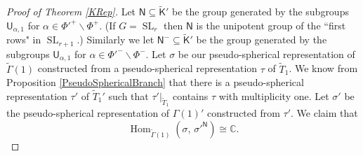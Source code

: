 \documentclass[10pt, letterpaper]{amsart}
\theoremstyle{plain}
\theoremstyle{definition}
\numberwithin{equation}{section}
\newcommand{\SL}{\operatorname{SL}}
\newcommand{\Tt}{\widetilde{T}}
\newcommand{\Gammaft}{\widetilde{\mathsf{\Gamma}}}
\newcommand{\Hom}{\operatorname{Hom}}
\newcommand{\Nf}{\mathsf{N}}
\newcommand{\Uf}{\mathsf{U}}
\newcommand{\Gammaf}{\mathsf{\Gamma}}
\newcommand{\Kft}{\widetilde{\mathsf{K}}}
\begin{document}
\begin{proof}[Proof of Theorem \ref{KRep}]
    Let $\Nf\subseteq\Kft'$ be the group generated by the subgroups $\Uf_{\alpha, 1}$ for $\alpha\in{\Phi'}^+\smallsetminus\Phi^+$. (If $G=\SL_r$ then $\Nf$ is the unipotent group of the ``first rows" in $\SL_{r+1}$.)  Similarly we let $\Nf^-\subseteq\Kft'$ be the group generated by the subgroups $\Uf_{\alpha, 1}$ for $\alpha\in{\Phi'}^-\smallsetminus\Phi^-$. Let $\sigma$ be our pseudo-spherical representation of $\Gammaft(1)$ constructed from a pseudo-spherical representation $\tau$ of $\Tt_1$. We know from Proposition \ref{PseudoSphericalBranch} that there is a pseudo-spherical representation $\tau'$ of $\Tt_1'$ such that $\tau'|_{\Tt_1}$ contains $\tau$ with multiplicity one. Let $\sigma'$ be the pseudo-spherical representation of $\Gammaf(1)'$ constructed from $\tau'$. We claim that
    \begin{equation}\label{ExtThmIso1}
        \Hom_{\Gammaft(1)}(\sigma,\,{\sigma'}^{\Nf})\cong \mathbb{C}.
    \end{equation}
    
    
    





\end{proof}
\end{document}
